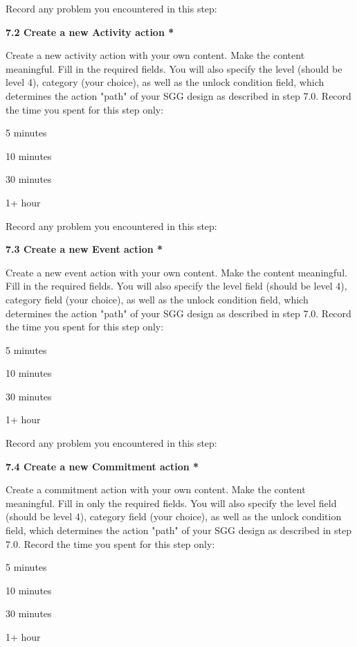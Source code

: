 Record any problem you encountered in this step:

{\bf 7.2 Create a new Activity action *}

Create a new activity action with your own content. Make the content meaningful. Fill in the required fields. You will also specify the level (should be level 4), category (your choice), as well as the unlock condition field, which determines the action "path" of your SGG design as described in step 7.0. Record the time you spent for this step only:

\begin{compactitem}
\item 5 minutes
\item  10 minutes
\item  30 minutes
\item  1+ hour
\end{compactitem}


Record any problem you encountered in this step:

{\bf 7.3 Create a new Event action *}

Create a new event action with your own content. Make the content meaningful. Fill in the required fields. You will also specify the level field (should be level 4), category field (your choice), as well as the unlock condition field, which determines the action "path" of your SGG design as described in step 7.0. Record the time you spent for this step only:

\begin{compactitem}
\item 5 minutes
\item  10 minutes
\item  30 minutes
\item  1+ hour
\end{compactitem}


Record any problem you encountered in this step:

{\bf 7.4 Create a new Commitment action *}

Create a commitment action with your own content. Make the content meaningful. Fill in only the required fields. You will also specify the level field (should be level 4), category field (your choice), as well as the unlock condition field, which determines the action "path" of your SGG design as described in step 7.0. Record the time you spent for this step only:

\begin{compactitem}
\item 5 minutes
\item  10 minutes
\item  30 minutes
\item  1+ hour
\end{compactitem}


